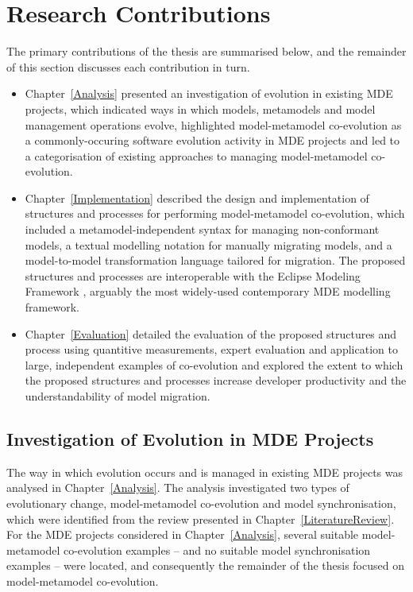 
\section{Research Contributions}
The primary contributions of the thesis are summarised below, and the remainder of this section discusses each contribution in turn.

\begin{itemize}
	\item Chapter~\ref{Analysis} presented an investigation of evolution in existing MDE projects, which indicated ways in which models, metamodels and model management operations evolve, highlighted model-metamodel co-evolution as a commonly-occuring software evolution activity in MDE projects and led to a categorisation of existing approaches to managing model-metamodel co-evolution.
	\item Chapter~\ref{Implementation} described the design and implementation of structures and processes for performing model-metamodel co-evolution, which included a metamodel-independent syntax for managing non-conformant models, a textual modelling notation for manually migrating models, and a model-to-model transformation language tailored for migration. The proposed structures and processes are interoperable with the Eclipse Modeling Framework \cite{steinberg09emf}, arguably the most widely-used contemporary MDE modelling framework.
	\item Chapter~\ref{Evaluation} detailed the evaluation of the proposed structures and process using quantitive measurements, expert evaluation and application to large, independent examples of co-evolution and explored the extent to which the proposed structures and processes increase developer productivity and the understandability of model migration.
\end{itemize}


\subsection{Investigation of Evolution in MDE Projects}
The way in which evolution occurs and is managed in existing MDE projects was analysed in Chapter~\ref{Analysis}. The analysis investigated two types of evolutionary change, model-metamodel co-evolution and model synchronisation, which were identified from the review presented in Chapter~\ref{LiteratureReview}. For the MDE projects considered in Chapter~\ref{Analysis}, several suitable model-metamodel co-evolution examples -- and no suitable model synchronisation examples -- were located, and consequently the remainder of the thesis focused on model-metamodel co-evolution.

